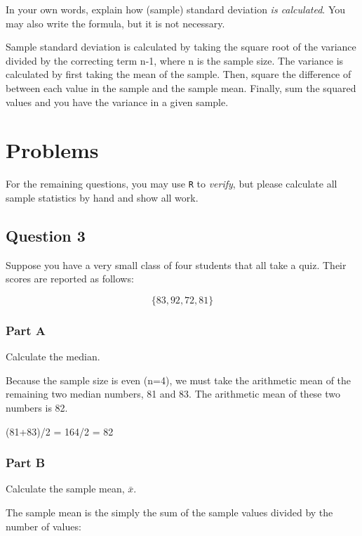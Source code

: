 \documentclass[
  letterpaper,
  DIV=11,
  numbers=noendperiod]{scrartcl}
\begin{document}
In your own words, explain how (sample) standard deviation \emph{is
calculated}. You may also write the formula, but it is not necessary.

Sample standard deviation is calculated by taking the square root of the
variance divided by the correcting term n-1, where n is the sample size.
The variance is calculated by first taking the mean of the sample. Then,
square the difference of between each value in the sample and the sample
mean. Finally, sum the squared values and you have the variance in a
given sample.

\hypertarget{problems}{%
\section{Problems}\label{problems}}

For the remaining questions, you may use \texttt{R} to \emph{verify},
but please calculate all sample statistics by hand and show all work.

\hypertarget{question-3}{%
\subsection{Question 3}\label{question-3}}

Suppose you have a very small class of four students that all take a
quiz. Their scores are reported as follows:

\[\{83, 92, 72, 81 \}
\]

\hypertarget{part-a-1}{%
\subsubsection{Part A}\label{part-a-1}}

Calculate the median.

Because the sample size is even (n=4), we must take the arithmetic mean
of the remaining two median numbers, 81 and 83. The arithmetic mean of
these two numbers is 82.

(81+83)/2 = 164/2 = 82

\hypertarget{part-b-1}{%
\subsubsection{Part B}\label{part-b-1}}

Calculate the sample mean, \(\bar{x}\).

The sample mean is the simply the sum of the sample values divided by
the number of values:
\end{document}
